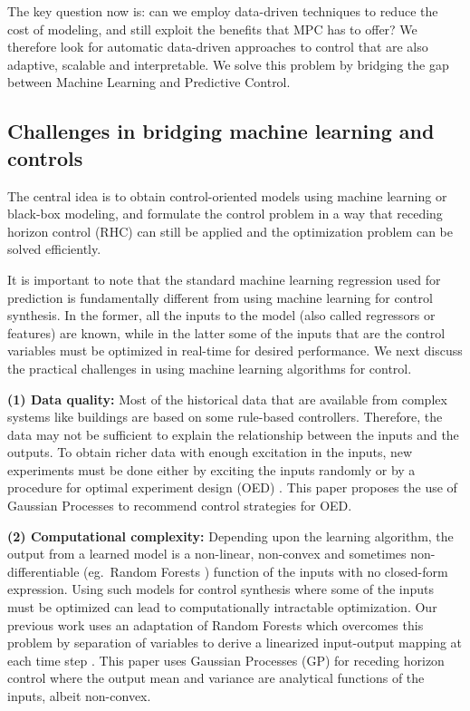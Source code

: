 The key question now is: can we employ data-driven techniques to reduce the cost of modeling, and still exploit the benefits that MPC has to offer?
We therefore look for automatic data-driven approaches to control that are also adaptive, scalable and interpretable.
We solve this problem by bridging the gap between Machine Learning and Predictive Control.

\subsection{Challenges in bridging machine learning and controls}
\label{SS:practical_challenges}

The central idea is to obtain control-oriented models using machine learning or black-box modeling, and formulate the control problem in a way that receding horizon control (RHC) can still be applied and the optimization problem can be solved efficiently.

It is important to note that the standard machine learning regression used for prediction is fundamentally different from using machine learning for control synthesis. In the former, all the inputs to the model (also called regressors or features) are known, while in the latter some of the inputs that are the control variables must be optimized in real-time for desired performance. 
We next discuss the practical challenges in using machine learning algorithms for control.

\noindent \textbf{(1) Data quality:} Most of the historical data that are available from complex systems like buildings are based on some rule-based controllers. Therefore, the data may not be sufficient to explain the relationship between the inputs and the outputs. To obtain richer data with enough excitation in the inputs, new experiments must be done either by exciting the inputs randomly or by a procedure for optimal experiment design (OED) \cite{Emery1998,Fedorov2010}. This paper proposes the use of Gaussian Processes to recommend control strategies for OED.

\noindent \textbf{(2) Computational complexity:} Depending upon the learning algorithm, the output from a learned model is a non-linear, non-convex and sometimes non-differentiable (eg.~Random Forests \cite{Friedman2001}) function of the inputs with no closed-form expression. Using such models for control synthesis where some of the inputs must be optimized can lead to computationally intractable optimization. Our previous work uses an adaptation of Random Forests which overcomes this problem by separation of variables to derive a linearized input-output mapping at each time step \cite{JainACC2017,JainCDC2017}.
This paper uses Gaussian Processes (GP) for receding horizon control where the output mean and variance are analytical functions of the inputs, albeit non-convex.

